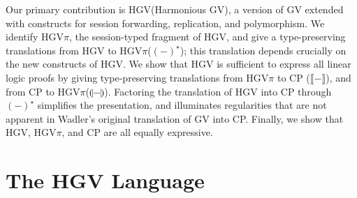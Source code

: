 \documentclass{easychair}
\newcommand{\cptogv}[1]{\llparenthesis{#1}\rrparenthesis}
\newcommand{\hgv}{HGV\xspace}
\newcommand{\hgvpi}{HGV$\pi$\xspace}
\newcommand{\lampi}[1]{({#1})^\star}
\newcommand{\hgvcp}[1]{\llbracket{#1}\rrbracket}
\begin{document}
Our primary contribution is \hgv (Harmonious GV), a version of GV extended with constructs for
session forwarding, replication, and polymorphism. We identify \hgvpi, the session-typed fragment of
\hgv, and give a type-preserving translations from \hgv to \hgvpi ($\lampi{-}$); this translation
depends crucially on the new constructs of \hgv.  We show that \hgv is sufficient to express all
linear logic proofs by giving type-preserving translations from \hgvpi to CP ($\hgvcp{-}$), and from
CP to \hgvpi ($\cptogv{-}$). Factoring the translation of \hgv into CP through $\lampi{-}$
simplifies the presentation, and illuminates regularities that are not apparent in Wadler's original
translation of GV into CP.  Finally, we show that \hgv, \hgvpi, and CP are all equally expressive.





\section{The \hgv Language}
\label{sect:hgv}
\end{document}
